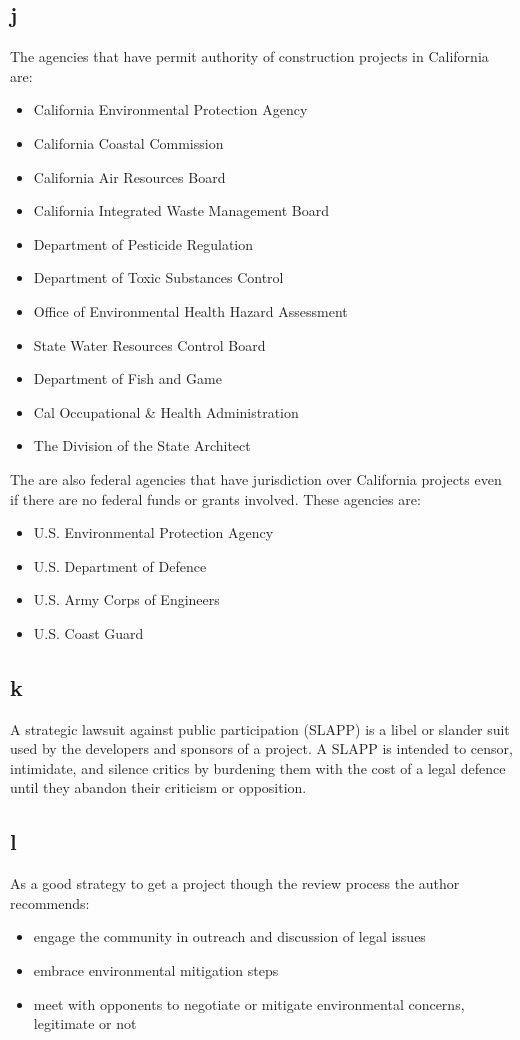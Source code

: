 \documentclass[12pt]{article} %
\begin{document}
	\subsection{j}
		The agencies that have permit authority of construction projects in California are:
		\begin{itemize}
			\item California Environmental Protection Agency
			\item California Coastal Commission
			\item California Air Resources Board
			\item California Integrated Waste Management Board
			\item Department of Pesticide Regulation
			\item Department of Toxic Substances Control
			\item Office of Environmental Health Hazard Assessment
			\item State Water Resources Control Board
			\item Department of Fish and Game
			\item Cal Occupational \& Health Administration
			\item The Division of the State Architect
		\end{itemize}
	
		The are also federal agencies that have jurisdiction over California projects even if there are no federal funds or grants involved. These agencies are:
		\begin{itemize}
			\item U.S. Environmental Protection Agency
			\item U.S. Department of Defence
			\item U.S. Army Corps of Engineers
			\item U.S. Coast Guard
		\end{itemize}
		
	\subsection{k}
		A strategic lawsuit against public participation (SLAPP) is a libel or slander suit used by the developers and sponsors of a project. A SLAPP is intended to censor, intimidate, and silence critics by burdening them with the cost of a legal defence until they abandon their criticism or opposition.
		
	\subsection{l}
		As a good strategy to get a project though the review process the author recommends:
		\begin{itemize}
			\item engage the community in outreach and discussion of legal issues
			\item embrace environmental mitigation steps
			\item meet with opponents to negotiate or mitigate environmental concerns, legitimate or not
		\end{itemize}
	
\end{document}
